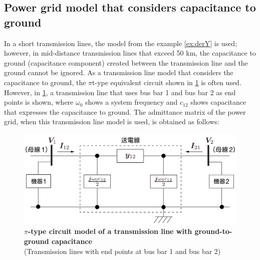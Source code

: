 \documentclass[graybox, envcountchap]{svmult}
\begin{document}
\subsection{Power grid model that considers capacitance to ground}\label{sec:transmodc}

In a short transmission lines, the model from the example \ref{ex:derY} is used; however, in mid-distance transmission lines that exceed 50 km, the capacitance to ground (capacitance component) created between the transmission line and the ground cannot be ignored. 
As a transmission line model that considers the capacitance to ground, the $\pi$t-ype equivalent circuit shown in \ref{fig:lines} is often used.
However, in \ref{fig:lines}, a transmission line that uses bus bar 1 and bus bar 2 as end points is shown, where $\omega_0$ shows a system frequency and $c_{12}$ shows capacitance that expresses the capacitance to ground.
The admittance matrix of the power grid, when this transmission line model is used, is obtained as follows: 

\begin{figure}[t]
\centering
\includegraphics[width = .85\linewidth]{figs/line_pix3}
\medskip
\caption{\textbf{$\pi$-type circuit model of a transmission line with ground-to-ground capacitance}\\
\centering(Transmission lines with end points at bus bar 1 and bus bar 2)}
\label{fig:lines} 
\medskip
\end{figure}


\end{document}
